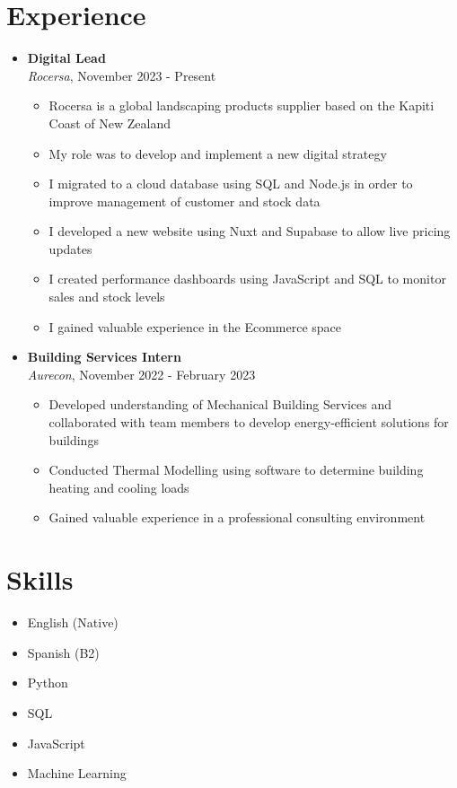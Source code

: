 \documentclass[a4paper,10pt]{article}
\begin{document}
\section*{Experience}
\begin{itemize}
    \item \textbf{Digital Lead} \\
    \textit{Rocersa}, November 2023 - Present \\
    \begin{itemize}
        \item Rocersa is a global landscaping products supplier based on the Kapiti Coast of New Zealand
        \item My role was to develop and implement a new digital strategy
        \item I migrated to a cloud database using SQL and Node.js in order to improve management of customer and stock data
        \item I developed a new website using Nuxt and Supabase to allow live pricing updates
        \item I created performance dashboards using JavaScript and SQL to monitor sales and stock levels
        \item I gained valuable experience in the Ecommerce space
    \end{itemize}
    \item \textbf{Building Services Intern} \\
    \textit{Aurecon}, November 2022 - February 2023 \\
    \begin{itemize}
        \item Developed understanding of Mechanical Building Services and collaborated with team members to develop energy-efficient solutions for buildings
        \item Conducted Thermal Modelling using software to determine building heating and cooling loads
        \item Gained valuable experience in a professional consulting environment
    \end{itemize}
\end{itemize}

\section*{Skills}
\begin{itemize}
    \item English (Native)
    \item Spanish (B2)
    \item Python
    \item SQL
    \item JavaScript
    \item Machine Learning
\end{itemize}
\end{document}
